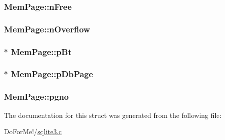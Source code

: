 \hypertarget{struct_mem_page_a3418a9aee707f57a73d8470f8a1228a8}{
\subsubsection[{n\-Free}]{ Mem\-Page\-::n\-Free}}\label{struct_mem_page_a3418a9aee707f57a73d8470f8a1228a8}
\hypertarget{struct_mem_page_a3f7fa1a1eba3af840ef887e8ddd6d2cc}{
\subsubsection[{n\-Overflow}]{ Mem\-Page\-::n\-Overflow}}\label{struct_mem_page_a3f7fa1a1eba3af840ef887e8ddd6d2cc}
\hypertarget{struct_mem_page_a949df1156f7392592eaeb64389068f99}{
\subsubsection[{p\-Bt}]{$\ast$ Mem\-Page\-::p\-Bt}}\label{struct_mem_page_a949df1156f7392592eaeb64389068f99}
\hypertarget{struct_mem_page_add322c1aed91e95d8dfe3ac3535d65b4}{
\subsubsection[{p\-Db\-Page}]{$\ast$ Mem\-Page\-::p\-Db\-Page}}\label{struct_mem_page_add322c1aed91e95d8dfe3ac3535d65b4}
\hypertarget{struct_mem_page_ad2b0c532abc799bbcf3b43df4f0b0546}{
\subsubsection[{pgno}]{ Mem\-Page\-::pgno}}\label{struct_mem_page_ad2b0c532abc799bbcf3b43df4f0b0546}


The documentation for this struct was generated from the following file\-:\begin{DoxyCompactItemize}
\item 
Do\-For\-Me!/\hyperlink{sqlite3_8c}{sqlite3.\-c}\end{DoxyCompactItemize}
